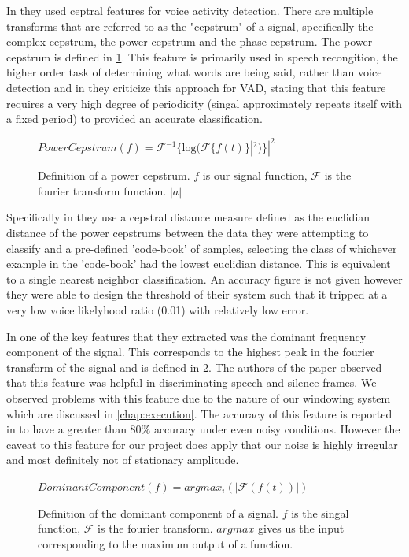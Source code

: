 \documentclass[ %
                    author={Sam Phippen},
                supervisor={Dr. Rafal Bogacz},
                     title={Real time voice activity detectors in noisy personal computing environments},
                  subtitle={},
                    degree={MEng},
                      year={2012} ]{thesis}
\begin{document}
In \cite{haigh} they used ceptral features for voice activity detection. There
are multiple transforms that are referred to as the "cepstrum" of a signal,
specifically the complex cepstrum, the power cepstrum and the phase
cepstrum\cite{childers}. The power cepstrum is defined in
\ref{eqn:power-cepstrum}. This feature is primarily used in speech recongition,
the higher order task of determining what words are being said, rather than
voice detection\cite{muda} and in \cite{atal} they criticize this approach for
VAD, stating that this feature requires a very high degree of periodicity
(singal approximately repeats itself with a fixed period) to provided an
accurate classification.

\begin{figure}
    $PowerCepstrum(f)=\mathcal{F}^{-1}\{\mbox{log}(\mathcal{F}\{ f(t) \}|^2)\}|^2$
    \caption{Definition of a power cepstrum. $f$ is our
    signal function, $\mathcal{F}$ is the fourier transform function. $|a|$}
    \label{eqn:power-cepstrum}

\end{figure}

Specifically in \cite{haigh} they use a cepstral distance measure defined as
the euclidian distance of the power cepstrums between the data they were
attempting to classify and a pre-defined 'code-book' of samples, selecting the
class of whichever example in the 'code-book' had the lowest euclidian
distance. This is equivalent to a single nearest neighbor classification. An
accuracy figure is not given however they were able to design the threshold of
their system such that it tripped at a very low voice likelyhood ratio (0.01) with
relatively low error.

In \cite{moattar} one of the key features that they extracted was the dominant
frequency component of the signal. This corresponds to the highest peak in the
fourier transform of the signal and is defined in \ref{eqn:dom-freq}. The
authors of the paper observed that this feature was helpful in discriminating
speech and silence frames. We observed problems with this feature due to the
nature of our windowing system which are discussed in \ref{chap:execution}. The
accuracy of this feature is reported in \cite{moattar} to have a greater than
80\% accuracy under even noisy conditions. However the caveat to this feature
for our project does apply that our noise is highly irregular and most
definitely not of stationary amplitude.

\begin{figure}
    $DominantComponent(f) = argmax_i(|\mathcal{F}(f(t))|)$
    \caption{Definition of the dominant component of a signal. $f$ is the singal
        function, $\mathcal{F}$ is the fourier transform. $argmax$ gives us the
        input corresponding to the maximum output of a function.}
    \label{eqn:dom-freq}
\end{figure}
\end{document}
